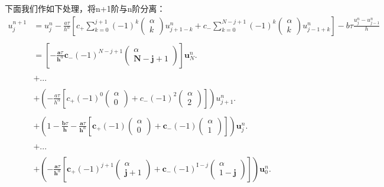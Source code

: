 	
下面我们作如下处理，将n+1阶与n阶分离：
\begin{equation*}
\begin{aligned}
u_{j}^{n+1} & =u_{j}^{n}-\frac{a \tau}{h^{\alpha}}\left[c_{+} \sum_{k=0}^{j+1}(-1)^{k} \left( \begin{array}{c}{\alpha} \\ {k}\end{array}\right) u_{j+1-k}^{n}+c_{-} \sum_{k=0}^{N-j+1}(-1)^{k} \left( \begin{array}{c}{\alpha} \\ {k}\end{array}\right) u_{j-1+k}^{n}\right]-b \tau \frac{u_{j}^{n}-u_{j-1}^{n}}{h}
\\ \\ & =\left[-\frac{\boldsymbol{a} \tau}{\boldsymbol{h}^{\alpha}} \boldsymbol{c}_{-}(-1)^{N-j+1} \left( \begin{array}{c}{\alpha} \\ {\boldsymbol{N}-\boldsymbol{j}+1}\end{array}\right)\right] \boldsymbol{u}_{N}^{n}.
\\ \\ &+...
\\ \\ &+\left(-\frac{a \tau}{h^{\alpha}}\left[c_{+} (-1)^{0} \left( \begin{array}{l}{\alpha} \\ {0}\end{array}\right)+c_{-} (-1)^{2} \left( \begin{array}{l}{\alpha} \\ {2}\end{array}\right)\right]\right) u_{j+1}^{n}.
\\ \\ &+\left(1-\frac{\boldsymbol{b} \tau}{\boldsymbol{h}}-\frac{\boldsymbol{a} \tau}{\boldsymbol{h}^{\alpha}}\left[\boldsymbol{c}_{+}(-1) \left( \begin{array}{l}{\alpha} \\ {0}\end{array}\right)+\boldsymbol{c}_{-}(-1) \left( \begin{array}{l}{\alpha} \\ {1}\end{array}\right)\right]\right) \boldsymbol{u}_{j}^{n}.
\\ \\ &+...
\\ \\ &+\left(-\frac{\boldsymbol{a} \tau}{\boldsymbol{h}^{\alpha}}\left[\boldsymbol{c}_{+}(-1)^{j+1} \left( \begin{array}{c}{\alpha} \\ {\boldsymbol{j}+1}\end{array}\right)+\boldsymbol{c}_{-}(-1)^{\mathrm{I}-j} \left( \begin{array}{c}{\alpha} \\ {1-\boldsymbol{j}}\end{array}\right)\right]\right) \boldsymbol{u}_{0}^{n}.
\end{aligned}
\end{equation*}

